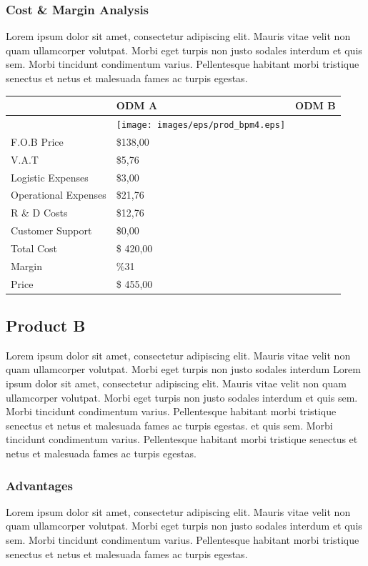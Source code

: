 \documentclass[11pt]{article}
\begin{document}
\subsubsection{Cost \& Margin Analysis}
Lorem ipsum dolor sit amet, consectetur adipiscing elit. Mauris vitae velit 
non quam ullamcorper volutpat. Morbi eget turpis non justo sodales interdum 
et quis sem. Morbi tincidunt condimentum varius. Pellentesque habitant morbi 
tristique senectus et netus et malesuada fames ac turpis egestas.\newline
\begin{tabular}{ | l | l | l | }\hline
  & ODM A & ODM B \\ \hline
  & \texttt{[image: images/eps/prod\_bpm4.eps]} 
	&  \\ \hline
  F.O.B Price & \$138,00 &  \\ \hline
  V.A.T & \$5,76 &  \\ \hline
  Logistic Expenses & \$3,00 & \\ \hline
  Operational Expenses & \$21,76 & \\ \hline
  R \& D Costs & \$12,76 &  \\ \hline
  Customer Support & \$0,00 &  \\ \hline
  Total Cost & \$ 420,00 &  \\ \hline
  Margin & \%31 &  \\ \hline
  Price & \$ 455,00 &  \\ \hline
\end{tabular}
\pagebreak


\subsection{Product B}
Lorem ipsum dolor sit amet, consectetur adipiscing elit. Mauris vitae velit 
non quam ullamcorper volutpat. Morbi eget turpis non justo sodales interdum 
Lorem ipsum dolor sit amet, consectetur adipiscing elit. Mauris vitae velit 
non quam ullamcorper volutpat. Morbi eget turpis non justo sodales interdum 
et quis sem. Morbi tincidunt condimentum varius. Pellentesque habitant morbi 
tristique senectus et netus et malesuada fames ac turpis egestas.
et quis sem. Morbi tincidunt condimentum varius. Pellentesque habitant morbi 
tristique senectus et netus et malesuada fames ac turpis egestas.\newline
\subsubsection{Advantages}
Lorem ipsum dolor sit amet, consectetur adipiscing elit. Mauris vitae velit 
non quam ullamcorper volutpat. Morbi eget turpis non justo sodales interdum 
et quis sem. Morbi tincidunt condimentum varius. Pellentesque habitant morbi 
tristique senectus et netus et malesuada fames ac turpis egestas.\newline
\end{document}
